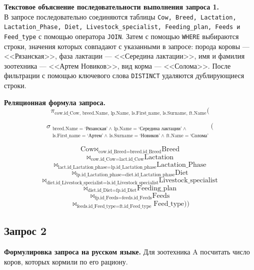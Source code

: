 \textbf{Текстовое объяснение последовательности выполнения запроса 1.}\\
В запросе последовательно соединяются таблицы \texttt{Cow, Breed, Lactation, Lactation\_Phase, Diet, Livestock\_specialist, Feeding\_plan, Feeds и Feed\_type} с помощью оператора \texttt{JOIN}. Затем с помощью \texttt{WHERE} выбираются строки, значения которых совпадают с указанными в запросе: порода коровы --- <<Рязанская>>, фаза лактации --- <<Середина лактации>>, имя и фамилия зоотехника --- <<Артем Новиков>>, вид корма --- <<Солома>>. После фильтрации с помощью ключевого слова \texttt{DISTINCT} удаляются дублирующиеся строки.

\textbf{Реляционная формула запроса.}
\[
\pi_{\text{cow.id\_Cow},\, \text{breed.Name},\, \text{lp.Name},\, \text{ls.First\_name},\, \text{ls.Surname},\, \text{ft.Name}} (
\]

\[
\sigma_{\substack{
\text{breed.Name}{=}\text{`Рязанская'} \wedge\, \text{lp.Name}{=}\text{`Середина лактации'} \wedge \\
\text{ls.First\_name}{=}\text{`Артем'} \wedge\, \text{ls.Surname}{=}\text{`Новиков'} \wedge\, \text{ft.Name}{=}\text{`Солома'}
}}
(
\]

\[
\text{Cow} \bowtie_{\text{cow.id\_Breed}=\text{breed.id\_Breed}} \text{Breed}
\]
\[
\bowtie_{\text{cow.id\_Cow}=\text{lact.id\_Cow}} \text{Lactation}
\]
\[
\bowtie_{\text{lact.id\_Lactation\_phase}=\text{lp.id\_Lactation\_phase}} \text{Lactation\_Phase}
\]
\[
\bowtie_{\text{lp.id\_Lactation\_phase}=\text{diet.id\_Lactation\_phase}} \text{Diet}
\]
\[
\bowtie_{\text{diet.id\_Livestock\_specialist}=\text{ls.id\_Livestock\_specialist}} \text{Livestock\_specialist}
\]
\[
\bowtie_{\text{diet.id\_Diet}=\text{fp.id\_Diet}} \text{Feeding\_plan}
\]
\[
\bowtie_{\text{fp.id\_Feeds}=\text{feeds.id\_Feeds}} \text{Feeds}
\]
\[
\bowtie_{\text{feeds.id\_Feed\_type}=\text{ft.id\_Feed\_type}} \text{Feed\_type}))
\]


\subsection{Запрос 2}
\textbf{Формулировка запроса на русском языке.}
Для зоотехника A посчитать число коров, которых кормили по его рациону.


